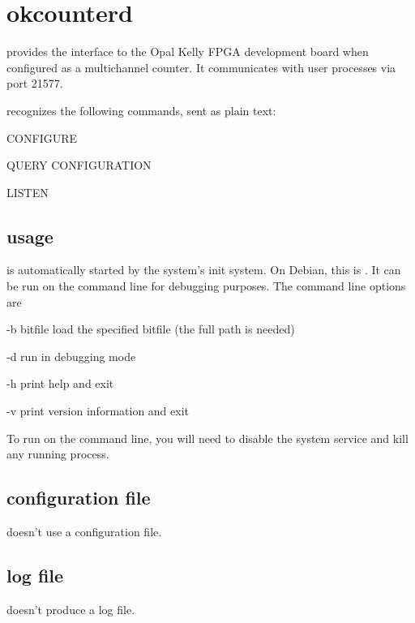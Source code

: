 \section{okcounterd}

 provides the interface to the Opal Kelly FPGA development board when configured as a multichannel counter.
It communicates with user processes via port 21577.

 recognizes the following commands, sent as plain text:
\begin{description*}
	\item[CONFIGURE]
	\item[QUERY CONFIGURATION]
	\item[LISTEN]
\end{description*}

\subsection{usage}
 is automatically started by the system's init system. On Debian, this is . It can be run on
the command line for debugging purposes. The command line options are
\begin{description*}
	\item[-b] \<bitfile\> load the specified bitfile (the full path is needed)
	\item[-d]	run in debugging mode
	\item[-h]	print help and exit
	\item[-v]	print version information and exit
\end{description*}
To run  on the command line, you will need to disable the system service
and kill any running  process.

\subsection{configuration file \label{confformat}}
 doesn't use a configuration file.

\subsection{log file}
 doesn't produce a log file.